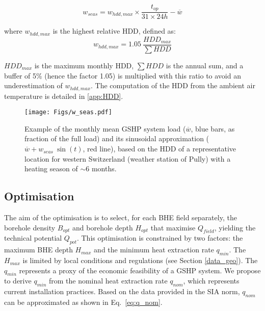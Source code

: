 \begin{equation}
\label{eq:w_seas}
    w_{seas} = w_{hdd,max} \times \frac{t_{op}}{31\times24h} - \overline{w} %
\end{equation}

where $w_{hdd,max}$ is the highest relative HDD, defined as:
\begin{equation}
\label{eq:w_HDD}
    w_{hdd,max} = 1.05 \  \frac{HDD_{max}}{\sum HDD}
\end{equation}

$HDD_{max}$ is the maximum monthly HDD, $\sum HDD$ is the annual sum, and a buffer of 5\% (hence the factor 1.05) is multiplied with this ratio to avoid an underestimation of $w_{hdd,max}$.
The computation of the HDD from the ambient air temperature is detailed in \ref{app:HDD}.

\begin{figure}[tb]
\centering
\texttt{[image: Figs/w\_seas.pdf]} 
\caption{Example of the monthly mean GSHP system load ($\overline{w}$, blue bars, as fraction of the full load) and its sinusoidal approximation ($\overline{w} + w_{seas} \ \sin(t)$, red line), based on the HDD of a representative location for western Switzerland (weather station of Pully) with a heating season of $\sim 6$ months.}
\label{fig:w_seas}
\end{figure}

\begin{comment} 
\begin{equation}
\label{eq:q}
    \overline{q} = q_{max} \times \frac{t_{op}}{365\times24}, \quad q_{seas} = q_{max} \times w_{hdd} \times \frac{t_{op}}{31\times24} - \overline{q}  %
\end{equation}
\end{comment} 

\subsection{Optimisation}
\label{optimisation}

The aim of the optimisation is to select, for each BHE field separately, the borehole density $B_{opt}$ and borehole depth $H_{opt}$ that maximise $Q_{field}$, yielding the technical potential $Q_{pot}$.
This optimisation is constrained by two factors: the maximum BHE depth $H_{max}$ and the minimum heat extraction rate $q_{min}$.
The $H_{max}$ is limited by local conditions and regulations (see Section \ref{data_geo}).
The $q_{min}$ represents a proxy of the economic feasibility of a GSHP system. 
We propose to derive $q_{min}$ from the nominal heat extraction rate $q_{nom}$, which represents current installation practices. 
Based on the data provided in the SIA norm, $q_{nom}$ can be approximated as shown in Eq.~\ref{eq:q_nom}.

